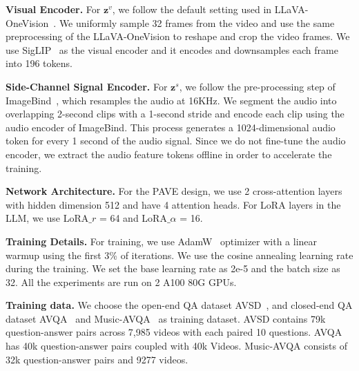 \medskip
\noindent \textbf{Visual Encoder.} For $\mathbf{z}^v$, we follow the default setting used in LLaVA-OneVision~\cite{li2024llava}. We uniformly sample 32 frames from the video and use the same preprocessing of the LLaVA-OneVision to reshape and crop the video frames. We use SigLIP~\cite{zhai2023sigmoidlosslanguageimage} as the visual encoder and it encodes and downsamples each frame into 196 tokens. 


\medskip
\noindent \textbf{Side-Channel Signal Encoder.}
For $\mathbf{z}^s$, we follow the pre-processing step of ImageBind~\cite{girdhar2023imagebind}, which resamples the audio at 16KHz. 
We segment the audio into overlapping 2-second clips with a 1-second stride and encode each clip using the audio encoder of ImageBind. This process generates a 1024-dimensional audio token for every 1 second of the audio signal.
Since we do not fine-tune the audio encoder, we extract the audio feature tokens offline in order to accelerate the training.

\medskip
\noindent \textbf{Network Architecture.} For the PAVE design, we use 2 cross-attention layers with hidden dimension 512 and have 4 attention heads. 
For LoRA layers in the LLM, we use LoRA$\_r$ = 64 and LoRA$\_\alpha$ = 16. 

\medskip
\noindent \textbf{Training Details.}
For training, we use AdamW~\cite{loshchilov2019decoupledweightdecayregularization} optimizer with a linear warmup using the first 3\% of iterations. We use the cosine annealing learning rate during the training. We set the base learning rate as 2e-5 and the batch size as 32. All the experiments are run on 2 A100 80G GPUs. 

\medskip
\noindent\textbf{Training data.} We choose the open-end QA dataset AVSD~\cite{alamri2019audiovisualsceneawaredialog}, and closed-end QA dataset AVQA~\cite{yang2022avqa} and Music-AVQA~\cite{Li2022Learning} as training dataset. AVSD contains 79k question-answer pairs across 7,985 videos with each paired 10 questions. AVQA has 40k question-answer pairs coupled with 40k Videos. Music-AVQA consists of 32k question-answer pairs and 9277 videos.

